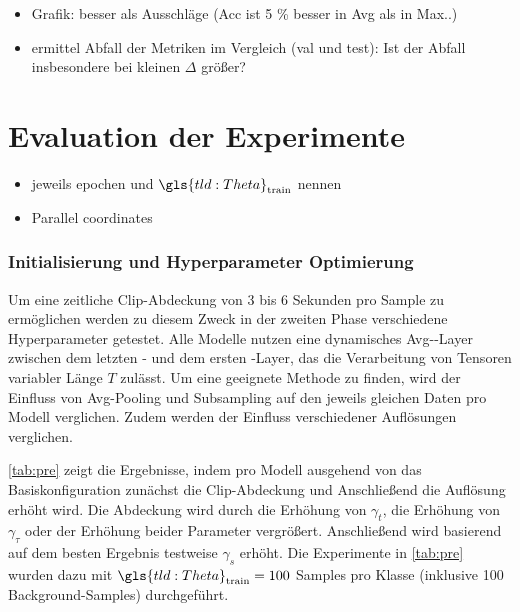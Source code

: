 \begin{tcolorbox}[title=Todo]
    \begin{itemize}
        \item Grafik: besser als Ausschläge (Acc ist 5 \% besser in Avg als in Max..)
        \item ermittel Abfall der Metriken im Vergleich (val und test): Ist der Abfall insbesondere bei kleinen $\Delta$ größer?
    \end{itemize}
\end{tcolorbox}

\section{Evaluation der Experimente}

\begin{tcolorbox}[title=Todo]
    \begin{itemize}
        \item jeweils epochen und $\gls{tld:Theta}_\text{train}$ nennen
        \item Parallel coordinates
    \end{itemize}
\end{tcolorbox}


\subsubsection{Initialisierung und Hyperparameter Optimierung}

Um eine zeitliche Clip-Abdeckung von 3 bis 6 Sekunden pro Sample zu ermöglichen werden zu diesem Zweck in der zweiten Phase verschiedene Hyperparameter getestet.
Alle Modelle nutzen eine dynamisches Avg-\pool-Layer zwischen dem letzten \conv- und dem ersten \fc-Layer, das die Verarbeitung von Tensoren variabler Länge $T$ zulässt.
Um eine geeignete Methode zu finden, wird der Einfluss von Avg-Pooling und Subsampling auf den jeweils gleichen Daten pro Modell verglichen.
Zudem werden der Einfluss verschiedener Auflösungen verglichen.

\autoref{tab:pre} zeigt die Ergebnisse, indem pro Modell ausgehend von das Basiskonfiguration zunächst die Clip-Abdeckung und Anschließend die Auflösung erhöht wird.
Die Abdeckung wird durch die Erhöhung von $\gamma_t$, die Erhöhung von $\gamma_\tau$ oder der Erhöhung beider Parameter vergrößert.
Anschließend wird basierend auf dem besten Ergebnis testweise $\gamma_s$ erhöht.
Die Experimente in \autoref{tab:pre} wurden dazu mit $\gls{tld:Theta}_\text{train} = 100$ Samples pro Klasse (inklusive 100 Background-Samples) durchgeführt.

